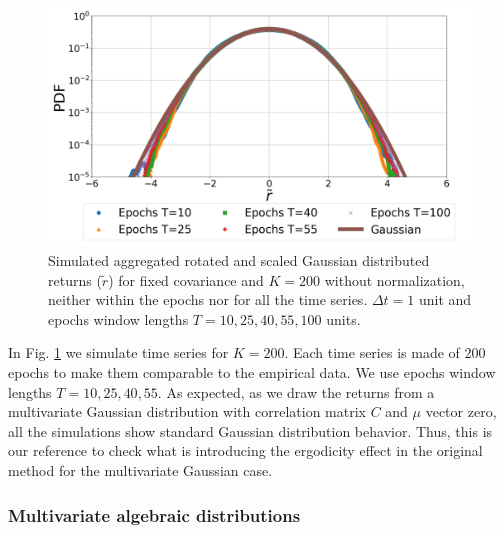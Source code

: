 \begin{figure}[htbp]
    \centering
    \includegraphics[width=0.6\columnwidth]
    {figures/06_epochs_sim_gauss_agg_ret_pairs_no_norm.png}
    \caption{Simulated aggregated rotated and scaled Gaussian distributed
             returns ($\tilde{r}$) for fixed covariance and $K=200$ without
             normalization, neither within the epochs nor for all the time
             series. $\Delta t = 1$ unit and epochs window  lengths
             $T=10, 25, 40, 55, 100$ units.}
    \label{fig:gauss_epochs_agg_ret_pairs_no_norm}
\end{figure}

In Fig. \ref{fig:gauss_epochs_agg_ret_pairs_no_norm} we simulate time series
for $K = 200$. Each time series is made of $200$ epochs to make them comparable
to the empirical data. We use epochs window lengths $T = 10, 25, 40, 55$. As
expected, as we draw the returns from a multivariate Gaussian distribution with
correlation matrix $C$ and $\mu$ vector zero, all the simulations show standard
Gaussian distribution behavior. Thus, this is our reference to check what is
introducing the ergodicity effect in the original method for the multivariate
Gaussian case.

\subsubsection{Multivariate algebraic distributions}\label{subsubsec:alg_sim}

